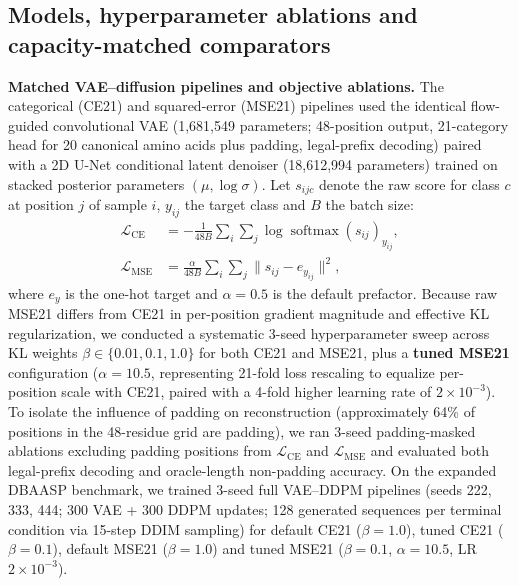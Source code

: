 \documentclass[unnumsec,webpdf,contemporary,large]{oup-authoring-template}
\newcommand{\rev}[1]{#1}
\begin{document}
\subsection{Models, hyperparameter ablations and capacity-matched comparators}

\textbf{Matched VAE--diffusion pipelines and objective ablations.} The categorical (CE21) and squared-error (MSE21) pipelines used the identical flow-guided convolutional VAE \cite{refVAE} (1,681,549 parameters; 48-position output, 21-category head for 20 canonical amino acids plus padding, legal-prefix decoding) paired with a 2D U-Net conditional latent denoiser \cite{refDDPM} (18,612,994 parameters) trained on stacked posterior parameters $(\mu, \log\sigma)$. Let $s_{ijc}$ denote the raw score for class $c$ at position $j$ of sample $i$, $y_{ij}$ the target class and $B$ the batch size:
\begin{align*}
\mathcal{L}_{\mathrm{CE}} &= -\frac{1}{48B}\sum_{i}\sum_{j}\log \operatorname{softmax}(s_{ij})_{y_{ij}}, \\
\mathcal{L}_{\mathrm{MSE}} &= \frac{\alpha}{48B}\sum_{i}\sum_{j}\bigl\lVert s_{ij} - e_{y_{ij}} \bigr\rVert^{2},
\end{align*}
where $e_y$ is the one-hot target and $\alpha=0.5$ is the default prefactor. \rev{Because raw MSE21 differs from CE21 in per-position gradient magnitude and effective KL regularization, we conducted a systematic 3-seed hyperparameter sweep across KL weights $\beta\in\{0.01, 0.1, 1.0\}$ for both CE21 and MSE21, plus a \textbf{tuned MSE21} configuration ($\alpha=10.5$, representing 21-fold loss rescaling to equalize per-position scale with CE21, paired with a 4-fold higher learning rate of $2\times 10^{-3}$). To isolate the influence of padding on reconstruction (approximately 64\% of positions in the 48-residue grid are padding), we ran 3-seed padding-masked ablations excluding padding positions from $\mathcal{L}_{\mathrm{CE}}$ and $\mathcal{L}_{\mathrm{MSE}}$ and evaluated both legal-prefix decoding and oracle-length non-padding accuracy. On the expanded DBAASP benchmark, we trained 3-seed full VAE--DDPM pipelines (seeds 222, 333, 444; 300 VAE + 300 DDPM updates; 128 generated sequences per terminal condition via 15-step DDIM sampling) for default CE21 ($\beta=1.0$), tuned CE21 ($\beta=0.1$), default MSE21 ($\beta=1.0$) and tuned MSE21 ($\beta=0.1$, $\alpha=10.5$, LR $2\times 10^{-3}$).}
\end{document}
